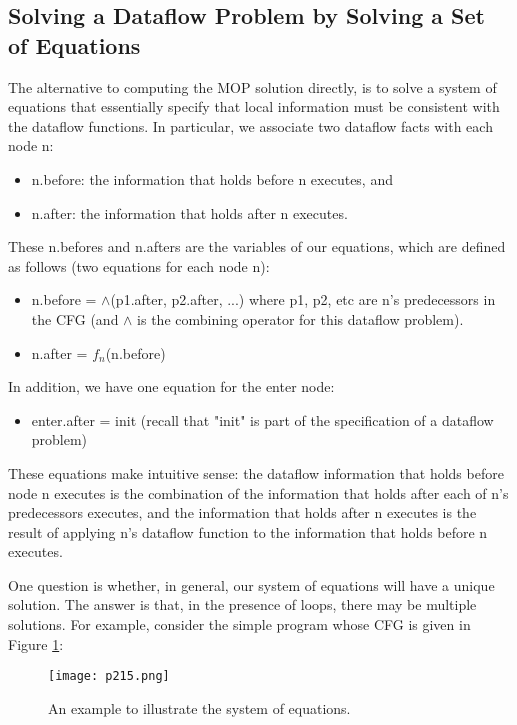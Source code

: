 \subsection{Solving a Dataflow Problem by Solving a Set of Equations}

The alternative to computing the MOP solution directly, is to solve a system of equations
that essentially specify that local information must be consistent with the dataflow functions.
In particular, we associate two dataflow facts with each node n:
\begin{itemize}
	\item n.before: the information that holds before n executes, and
	\item n.after: the information that holds after n executes.
\end{itemize}

These n.befores and n.afters are the variables of our equations,
which are defined as follows (two equations for each node n):


\begin{itemize}
	\item n.before = $\wedge$(p1.after, p2.after, ...)
	      where p1, p2, etc are n's predecessors in the CFG (and $\wedge$ is the
	      combining operator for this dataflow problem).
	\item n.after = $f_n$(n.before)
\end{itemize}

In addition, we have one equation for the enter node:

\begin{itemize}

	\item enter.after = init (recall that "init" is part of the specification of a dataflow problem)
\end{itemize}

These equations make intuitive sense: the dataflow information that holds
before node n executes is the combination of the information that holds after
each of n's predecessors executes, and the information that holds after n
executes is the result of applying n's dataflow function to the information
that holds before n executes.

One question is whether, in general, our system of equations will have a
unique solution. The answer is that, in the presence of loops, there may
be multiple solutions. For example, consider the simple program whose CFG
is given in Figure \ref{fig:p215}:


\begin{figure}[H]
	\centering
	\texttt{[image: p215.png]}
	\caption{An example to illustrate the system of equations.}
	\label{fig:p215}
\end{figure}

